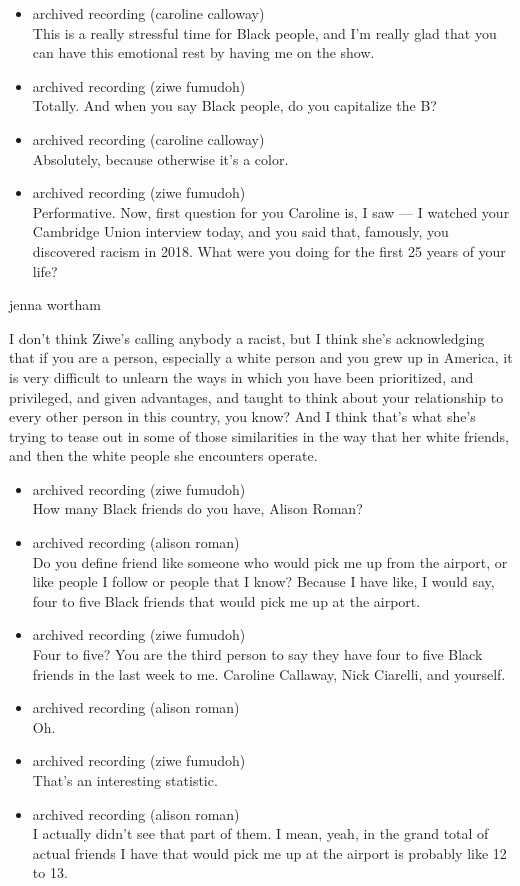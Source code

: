 \begin{itemize}
\item
  archived recording (caroline calloway)\\
  This is a really stressful time for Black people, and I'm really glad
  that you can have this emotional rest by having me on the show.
\item
  archived recording (ziwe fumudoh)\\
  Totally. And when you say Black people, do you capitalize the B?
\item
  archived recording (caroline calloway)\\
  Absolutely, because otherwise it's a color.
\item
  archived recording (ziwe fumudoh)\\
  Performative. Now, first question for you Caroline is, I saw --- I
  watched your Cambridge Union interview today, and you said that,
  famously, you discovered racism in 2018. What were you doing for the
  first 25 years of your life?
\end{itemize}

jenna wortham

I don't think Ziwe's calling anybody a racist, but I think she's
acknowledging that if you are a person, especially a white person and
you grew up in America, it is very difficult to unlearn the ways in
which you have been prioritized, and privileged, and given advantages,
and taught to think about your relationship to every other person in
this country, you know? And I think that's what she's trying to tease
out in some of those similarities in the way that her white friends, and
then the white people she encounters operate.

\begin{itemize}
\item
  archived recording (ziwe fumudoh)\\
  How many Black friends do you have, Alison Roman?
\item
  archived recording (alison roman)\\
  Do you define friend like someone who would pick me up from the
  airport, or like people I follow or people that I know? Because I have
  like, I would say, four to five Black friends that would pick me up at
  the airport.
\item
  archived recording (ziwe fumudoh)\\
  Four to five? You are the third person to say they have four to five
  Black friends in the last week to me. Caroline Callaway, Nick
  Ciarelli, and yourself.
\item
  archived recording (alison roman)\\
  Oh.
\item
  archived recording (ziwe fumudoh)\\
  That's an interesting statistic.
\item
  archived recording (alison roman)\\
  I actually didn't see that part of them. I mean, yeah, in the grand
  total of actual friends I have that would pick me up at the airport is
  probably like 12 to 13.
\end{itemize}

